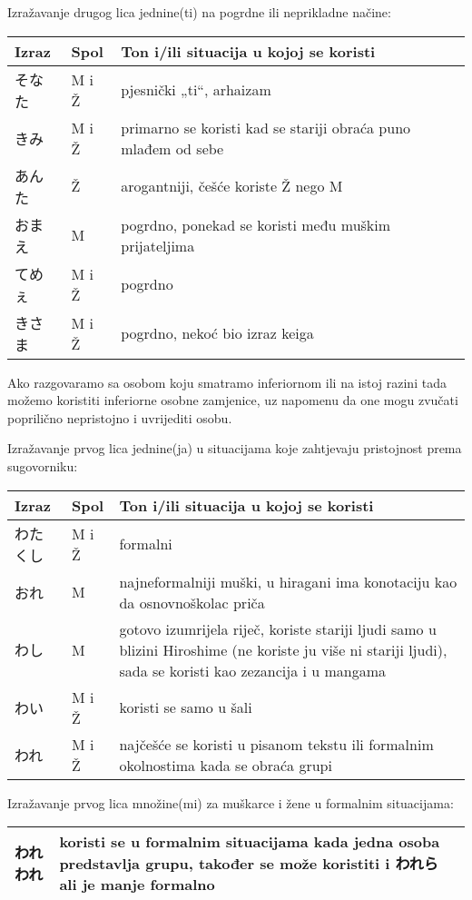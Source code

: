 	Izražavanje drugog lica jednine(ti) na pogrdne ili neprikladne načine: 
	\begin{table}[!h]
	\begin{tabular}{l l l}
		\toprule[2pt]
		Izraz 			&Spol	&Ton i/ili situacija u kojoj se koristi\\ 
		\midrule
		そなた			&M i Ž	&pjesnički „ti“, arhaizam\\
		きみ\footnotemark[2]	&M i Ž	&primarno se koristi kad se stariji obraća puno mlađem od sebe\\
		あんた			&Ž	&arogantniji, češće koriste Ž nego M\\
		おまえ			&M	&pogrdno, ponekad se koristi među muškim prijateljima\\
		てめぇ			&M i Ž 	&pogrdno\\
		きさま			&M i Ž 	&pogrdno, nekoć bio izraz keiga\footnotemark[3]\\
		\bottomrule[2pt]
	\end{tabular}
	\end{table}
	
	
		Ako razgovaramo sa osobom koju smatramo inferiornom ili na istoj razini tada možemo koristiti inferiorne osobne zamjenice, uz napomenu da one mogu zvučati poprilično nepristojno i uvrijediti osobu.
		
	Izražavanje prvog lica jednine(ja) u situacijama koje zahtjevaju pristojnost prema sugovorniku: 
	\begin{table}[!h]	
	\begin{tabular}{l l p{400pt}}
		\toprule[2pt]
		Izraz		&Spol	&Ton i/ili situacija u kojoj se koristi\\
		\midrule
		わたくし	&M i Ž	&formalni\\
		おれ		&M	&najneformalniji muški, u hiragani ima konotaciju kao da osnovnoškolac priča\\
		わし		&M	&gotovo izumrijela riječ, koriste stariji ljudi samo u blizini Hiroshime (ne koriste ju više ni stariji ljudi), sada se koristi kao zezancija i u mangama\\
		わい		&M i Ž 	&koristi se samo u šali\\
		われ		&M i Ž	&najčešće se koristi u pisanom tekstu ili formalnim okolnostima kada se obraća grupi\\
		\bottomrule[2pt]
	\end{tabular}
	\end{table}

	Izražavanje prvog lica množine(mi) za muškarce i žene u formalnim situacijama:
	\begin{table}[!h]
		\begin{tabular}{l p{400pt}}
			\toprule[2pt]
			われわれ&koristi se u formalnim situacijama kada jedna osoba predstavlja grupu, također se može koristiti i われら ali je manje formalno\\
			\bottomrule[2pt]
	\end{tabular}
	\end{table}

